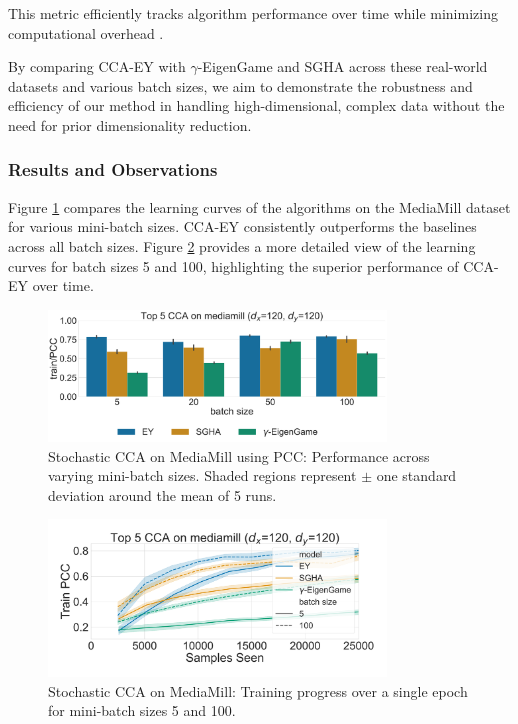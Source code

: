 This metric efficiently tracks algorithm performance over time while minimizing computational overhead \citep{meng2021online, gemp2022generalized, ma2015finding, ge2016efficient}.

By comparing CCA-EY with $\gamma$-EigenGame and SGHA across these real-world datasets and various batch sizes, we aim to demonstrate the robustness and efficiency of our method in handling high-dimensional, complex data without the need for prior dimensionality reduction.

\subsubsection{Results and Observations}
Figure \ref{fig:corr_mediamill} compares the learning curves of the algorithms on the MediaMill dataset for various mini-batch sizes. CCA-EY consistently outperforms the baselines across all batch sizes. Figure \ref{fig:learningcurve_mediamill} provides a more detailed view of the learning curves for batch sizes 5 and 100, highlighting the superior performance of CCA-EY over time.
\begin{figure}
\centering
\includegraphics[width=0.8\textwidth]{figures/CCA/mediamill_models_different_batch_sizes}
\caption{Stochastic CCA on MediaMill using PCC: Performance across varying mini-batch sizes. Shaded regions represent $\pm$ one standard deviation around the mean of 5 runs.}
\label{fig:corr_mediamill}
\end{figure}
\begin{figure}
\centering
\includegraphics[width=0.8\textwidth]{figures/CCA/mediamill_allbatchsizes_pcc}
\caption{Stochastic CCA on MediaMill: Training progress over a single epoch for mini-batch sizes 5 and 100.}
\label{fig:learningcurve_mediamill}
\end{figure}

